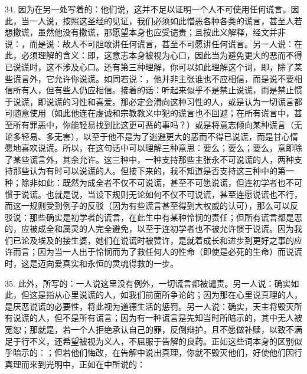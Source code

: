 34. 因为在另一处写着的：他们说，这并不足以证明一个人不可使用任何谎言。因此，当一人说，按照这圣经的见证，我们必须如此憎恶各种各类的谎言，甚至人若想撒谎，虽然他没有撒谎，那愿望本身也应受谴责；且按此义解释，经文并非说：，而是说：故人不可胆敢讲任何谎言，甚至不可愿讲任何谎言。另一人说：在此，必须理解的含义：即，这意志本身被视为心口，因此当为避免更大的恶而不得已说谎时，这不涉及心口。还有第三种理解，你可以如此理解这个词，即，除了某些谎言外，它允许你说谎。如同若说：，他并非主张谁也不应相信，而是说不要相信所有人，但有些人仍应相信。接着的话：听起来似乎不是禁止说谎，而是禁止惯于说谎，即说谎的习性和喜爱。那必定会滑向这种习性的人，或是认为一切谎言都可随意使用（如此他连在虔诚和宗教教义中犯的谎言也不回避；在所有谎言中，甚至所有罪恶中，你能轻易找到比这更可恶的事吗？）或是将意志倾向某种谎言（无论多轻易、多无害），以至于他不是为了逃避更大的恶而不得已说谎，而是甘心情愿地喜欢说谎。所以，在这句话中可以理解三种意思：要么；要么；要么，意即除了某些谎言外，其余允许。这三种中，一种支持那些主张永不可说谎的人，两种支持那些认为有时可以说谎的人。但接下来的，我不知道是否支持这三种中的第一种；除非如此：既然为成全者不仅不可说谎，甚至不可愿说谎，但连初学者也不可惯于说谎。也就是说，当设下规则无论如何不仅不可说谎，甚至连愿说谎也不行，而这一规则受到例子的反驳（因为有些谎言甚至得到大权威的认可），那么可以反驳说：那些确实是初学者的谎言，在此生中有某种怜悯的责任；但所有谎言都是恶的，应被成全和属灵的人完全避免，以至于连初学者也不被允许惯于说谎。因为我们已论及埃及的接生婆，她们在说谎时被赞许，是就着成长和进步到更好之事的应许而言；因为当一人出于怜悯而为了救任何人的性命（即使是必死的生命）而说谎时，这是迈向爱真实和永恒的灵魂得救的一步。\par

35. 此外，所写的：一人说这里没有例外，一切谎言都被谴责。另一人说：确实如此，但这是指从心里说谎的人，如我们前面所争论的；因为那在心里说真理的人，是厌恶说谎的必要性，将此视为道德生活的惩罚。另一人说：确实，天主将毁灭所有说谎的人，但不是所有谎言；因为有一种谎言是先知当时所暗示的，其中无人被宽恕；那就是，若一个人拒绝承认自己的罪，反倒辩护，且不愿做补赎，以致不满足于行不义，还希望被视为义人，不屈服于告解的良药。正如这些词本身的区别似乎暗示的：；但若他们悔改，在告解中说出真理，你就不毁灭他们，好使他们因行真理而来到光明中，正如在中所说的：\par

